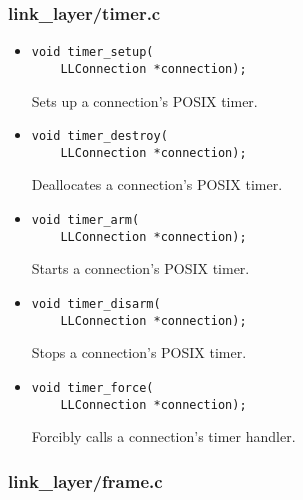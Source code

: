 \documentclass[11pt,a4paper,twocolumn]{article}
\begin{document}
\subsubsection{link\_layer/timer.c}

\begin{itemize}
    \item \begin{lstlisting}
void timer_setup(
    LLConnection *connection);
    \end{lstlisting}

          Sets up a connection's POSIX timer.

    \item \begin{lstlisting}
void timer_destroy(
    LLConnection *connection);
    \end{lstlisting}

          Deallocates a connection's POSIX timer.

    \item \begin{lstlisting}
void timer_arm(
    LLConnection *connection);
    \end{lstlisting}

          Starts a connection's POSIX timer.

    \item \begin{lstlisting}
void timer_disarm(
    LLConnection *connection);
    \end{lstlisting}

          Stops a connection's POSIX timer.

    \item \begin{lstlisting}
void timer_force(
    LLConnection *connection);
    \end{lstlisting}

          Forcibly calls a connection's timer handler.

\end{itemize}

\subsubsection{link\_layer/frame.c}
\end{document}
